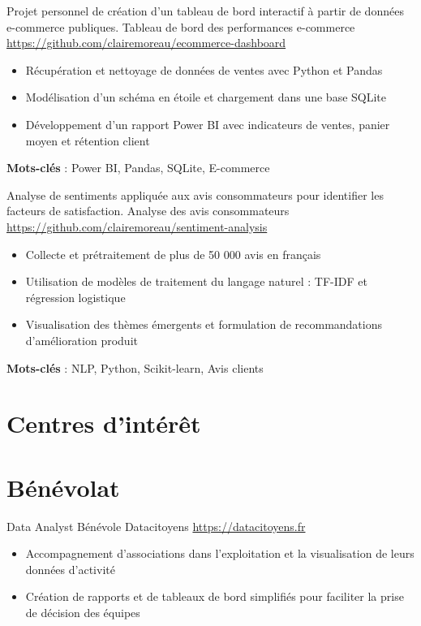 \documentclass[a4paper, serif, 10pt]{moderncv}
\begin{document}
        {Projet personnel de création d'un tableau de bord interactif à partir de données e-commerce publiques.}
        {Tableau de bord des performances e-commerce}
        {\url{https://github.com/clairemoreau/ecommerce-dashboard}}
        {}
        {\begin{itemize}
\item Récupération et nettoyage de données de ventes avec Python et Pandas
\item Modélisation d'un schéma en étoile et chargement dans une base SQLite
\item Développement d'un rapport Power BI avec indicateurs de ventes, panier moyen et rétention client
\end{itemize}
\textbf{Mots-clés} : Power BI, Pandas, SQLite, E-commerce}

        {Analyse de sentiments appliquée aux avis consommateurs pour identifier les facteurs de satisfaction.}
        {Analyse des avis consommateurs}
        {\url{https://github.com/clairemoreau/sentiment-analysis}}
        {}
        {\begin{itemize}
\item Collecte et prétraitement de plus de 50 000 avis en français
\item Utilisation de modèles de traitement du langage naturel : TF-IDF et régression logistique
\item Visualisation des thèmes émergents et formulation de recommandations d'amélioration produit
\end{itemize}
\textbf{Mots-clés} : NLP, Python, Scikit-learn, Avis clients}
\section{Centres d'intérêt}

\section{Bénévolat}

        {Data Analyst Bénévole}
        {Datacitoyens}
        {\url{https://datacitoyens.fr}}
        {}
        {\begin{itemize}
\item Accompagnement d'associations dans l'exploitation et la visualisation de leurs données d'activité
\item Création de rapports et de tableaux de bord simplifiés pour faciliter la prise de décision des équipes
\end{itemize}}
    
\end{document}
